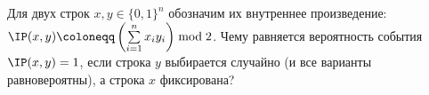 Для двух строк $x, y \in \{0, 1\}^n$ обозначим их внутреннее произведение:
$\IP(x, y) \coloneqq \left( \sum\limits_{i = 1}^n x_i y_i \right) \bmod 2$. Чему равняется вероятность
события $\IP(x, y) = 1$, если строка $y$ выбирается случайно (и все варианты равновероятны), а строка $x$
фиксирована?